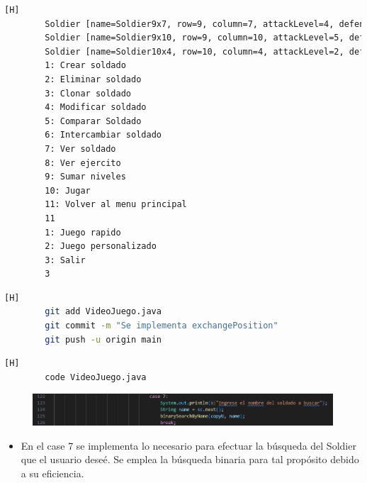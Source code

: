 \documentclass{article}
\begin{document}
\begin{lstlisting}[language=bash,caption={Compilando y probando el metodo exchangeSoldier  }][H]
		Soldier [name=Soldier9x7, row=9, column=7, attackLevel=4, defenseLevel=3, actualLife=2, speed=0, attitude=Repose, current=true]
		Soldier [name=Soldier9x10, row=9, column=10, attackLevel=5, defenseLevel=2, actualLife=5, speed=0, attitude=Repose, current=true]
		Soldier [name=Soldier10x4, row=10, column=4, attackLevel=2, defenseLevel=4, actualLife=3, speed=0, attitude=Repose, current=true]
		1: Crear soldado
		2: Eliminar soldado
		3: Clonar soldado
		4: Modificar soldado
		5: Comparar Soldado
		6: Intercambiar soldado
		7: Ver soldado
		8: Ver ejercito
		9: Sumar niveles
		10: Jugar
		11: Volver al menu principal
		11
		1: Juego rapido
		2: Juego personalizado
		3: Salir
		3
	\end{lstlisting}
	
	\begin{lstlisting}[language=bash,caption={Commit: b825c23cde0e98518d0047f2867cb2a3f0d6fcf2}][H]
		git add VideoJuego.java
		git commit -m "Se implementa exchangePosition"			
		git push -u origin main
	\end{lstlisting}
	
	\begin{lstlisting}[language=bash,caption={Se implementa el método para intercambiar posiciones entre soldados }][H]
		code VideoJuego.java
	\end{lstlisting}
	
	\begin{figure}[H]
		\centering
		\includegraphics[width=1\textwidth,keepaspectratio]{img/searchSoldier.jpg}
	\end{figure}
	
	\begin{itemize}	
		\item En el case 7 se implementa lo necesario para efectuar la búsqueda del Soldier que el usuario deseé. Se emplea la búsqueda binaria para tal propósito debido a su eficiencia.
	\end{itemize}
	
\end{document}
